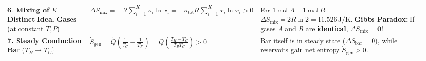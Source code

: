 \begin{formulacard}
\begin{tabularx}{\linewidth}{@{}l l X@{}}
\textbf{6. Mixing of $K$ Distinct Ideal Gases} (at constant $T, P$) & $\displaystyle \Delta S_{\mathrm{mix}} = -R\sum_{i=1}^K n_i\ln x_i = -n_{\mathrm{tot}}R\sum_{i=1}^K x_i\ln x_i > 0$ & For $1\,\si{\mole}\ A + 1\,\si{\mole}\ B$: $\Delta S_{\mathrm{mix}} = 2R\ln 2 = \SI{11.526}{\joule\per\kelvin}$. \textbf{Gibbs Paradox:} If gases $A$ and $B$ are \textbf{identical}, $\Delta S_{\mathrm{mix}} = \mathbf{0}$! \\[5pt]
\textbf{7. Steady Conduction Bar} ($T_H \to T_C$) & $\displaystyle \dot{S}_{\mathrm{gen}} = \dot{Q}\left(\frac{1}{T_C} - \frac{1}{T_H}\right) = \dot{Q}\left(\frac{T_H - T_C}{T_H T_C}\right) > 0$ & Bar itself is in steady state ($\Delta S_{\mathrm{bar}} = 0$), while reservoirs gain net entropy $\dot{S}_{\mathrm{gen}} > 0$. \\
\bottomrule
\end{tabularx}
\end{formulacard}

